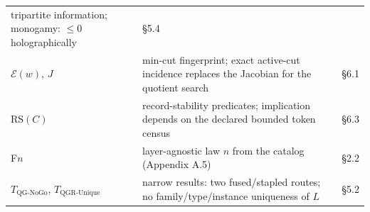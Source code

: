 \begin{longtable}[]{@{}lll@{}}
\begin{minipage}[t]{0.49\columnwidth}
tripartite information; monogamy: \(\le 0\) holographically\strut
\end{minipage} & \begin{minipage}[t]{0.17\columnwidth}\raggedright
§5.4\strut
\end{minipage}\tabularnewline
\begin{minipage}[t]{0.27\columnwidth}\raggedright
\(\mathcal E(w)\), \(J\)\strut
\end{minipage} & \begin{minipage}[t]{0.49\columnwidth}\raggedright
min-cut fingerprint; exact active-cut incidence replaces the Jacobian for the quotient search\strut
\end{minipage} & \begin{minipage}[t]{0.17\columnwidth}\raggedright
§6.1\strut
\end{minipage}\tabularnewline
\begin{minipage}[t]{0.27\columnwidth}\raggedright
\(\mathrm{RS}(C)\)\strut
\end{minipage} & \begin{minipage}[t]{0.49\columnwidth}\raggedright
record-stability predicates; implication depends on the declared bounded token census\strut
\end{minipage} & \begin{minipage}[t]{0.17\columnwidth}\raggedright
§6.3\strut
\end{minipage}\tabularnewline
\begin{minipage}[t]{0.27\columnwidth}\raggedright
F\(n\)\strut
\end{minipage} & \begin{minipage}[t]{0.49\columnwidth}\raggedright
layer-agnostic law \(n\) from the catalog (Appendix A.5)\strut
\end{minipage} & \begin{minipage}[t]{0.17\columnwidth}\raggedright
§2.2\strut
\end{minipage}\tabularnewline
\begin{minipage}[t]{0.27\columnwidth}\raggedright
\(T_{\mathrm{QG\text{-}NoGo}}\), \(T_{\mathrm{QGR\text{-}Unique}}\)\strut
\end{minipage} & \begin{minipage}[t]{0.49\columnwidth}\raggedright
narrow results: two fused/stapled routes; no family/type/instance uniqueness of \(L\)\strut
\end{minipage} & \begin{minipage}[t]{0.17\columnwidth}\raggedright
§5.2\strut
\end{minipage}\tabularnewline
\bottomrule
\end{longtable}

